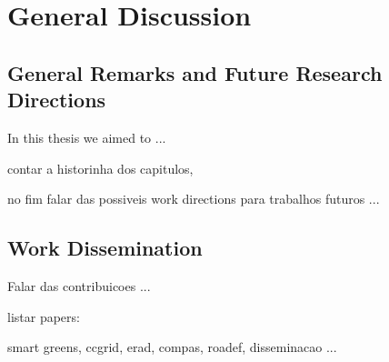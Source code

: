 \chapter{General Discussion}
\label{chap-conclusion}

\section{General Remarks and Future Research Directions}

In this thesis we aimed to ... 

contar a historinha dos capitulos,

no fim falar das possiveis work directions para trabalhos futuros ...


\section{Work Dissemination}

Falar das contribuicoes ...

listar papers:

smart greens,
ccgrid,
erad, compas, roadef, disseminacao ...
